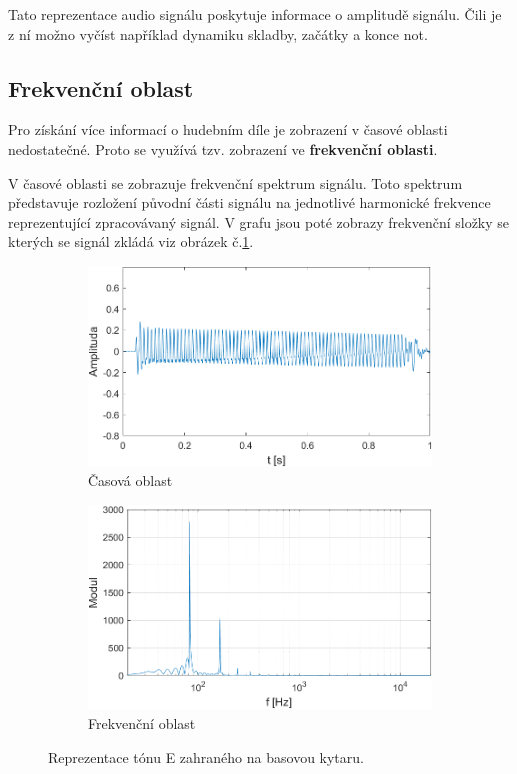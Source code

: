   Tato reprezentace audio signálu poskytuje informace o amplitudě signálu. Čili je z ní možno vyčíst například dynamiku skladby, začátky a konce not.
  
  \subsection{Frekvenční oblast}
  Pro získání více informací o hudebním díle je zobrazení v časové oblasti nedostatečné.
  Proto se využívá tzv. zobrazení ve \textbf{frekvenční oblasti}.

  V časové oblasti se zobrazuje frekvenční spektrum signálu.
  Toto spektrum představuje rozložení původní části signálu na jednotlivé harmonické frekvence reprezentující zpracovávaný signál.
  V grafu jsou poté zobrazy frekvenční složky se kterých se signál zkládá viz obrázek č.\ref*{fig:Bass_tone}.

  \begin{figure}[H]
    \centering
    \begin{subfigure}[b]{0.8\linewidth}
        \includegraphics[width = \linewidth]{obrazky/Bass_tone_waveform.png}
        \caption{Časová oblast}
    \end{subfigure}
    \begin{subfigure}[b]{0.8\linewidth}
        \includegraphics[width = \linewidth]{obrazky/Bass_tone_spectrum.png}
        \caption{Frekvenční oblast}
    \end{subfigure}
    \caption{Reprezentace tónu E zahraného na basovou kytaru.}
    \label{fig:Bass_tone}
\end{figure}
  
